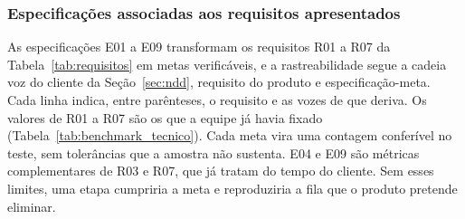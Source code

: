 \subsubsection{Especificações associadas aos requisitos apresentados}
\label{subsubsec:espec_requisitos}

As especificações E01 a E09 transformam os requisitos R01 a R07 da Tabela~\ref{tab:requisitos} em metas verificáveis, e a rastreabilidade segue a cadeia voz do cliente da Seção~\ref{sec:ndd}, requisito do produto e especificação-meta. Cada linha indica, entre parênteses, o requisito e as vozes de que deriva. Os valores de R01 a R07 são os que a equipe já havia fixado (Tabela~\ref{tab:benchmark_tecnico}). Cada meta vira uma contagem conferível no teste, sem tolerâncias que a amostra não sustenta. E04 e E09 são métricas complementares de R03 e R07, que já tratam do tempo do cliente. Sem esses limites, uma etapa cumpriria a meta e reproduziria a fila que o produto pretende eliminar.


